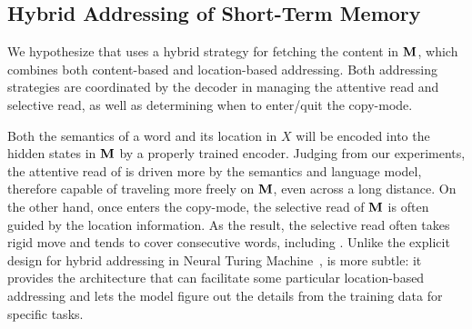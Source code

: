  

\subsection{Hybrid Addressing of Short-Term Memory} 
\label{cp3.sec.reading}
We hypothesize that \copynet uses a hybrid strategy for fetching the content in $\mathbf{M}$, 
which combines both content-based and location-based addressing. 
Both addressing strategies are coordinated by the decoder in managing the attentive read and selective read, 
as well as determining when to enter/quit the copy-mode. 

Both the semantics of a word and its location in $X$ will be encoded into the hidden states in $\mathbf{M}$ by a properly trained encoder. 
Judging from our experiments, the attentive read of \copynet is driven more by the semantics and language model, 
therefore capable of traveling more freely on $\mathbf{M}$, even across a long distance. 
On the other hand, once \copynet enters the copy-mode, the selective read of $\mathbf{M}$ is often guided by the location information. 
As the result, the selective read often takes rigid move and tends to cover consecutive words, including \unk.  
Unlike the explicit design for hybrid addressing in Neural Turing Machine~\cite{graves2014neural,kurach2015neural}, 
\copynet is more subtle: it provides the architecture that can facilitate some particular location-based addressing and 
lets the model figure out the details from the training data for specific tasks. 

